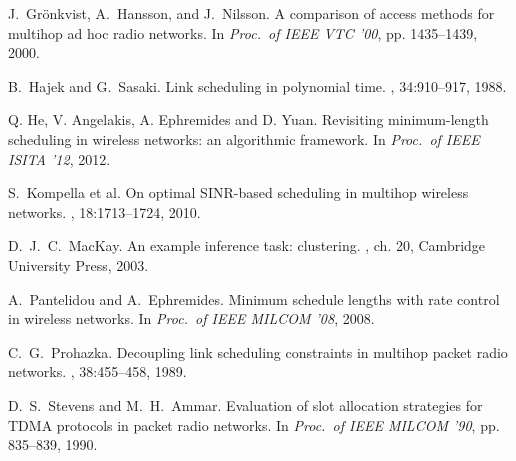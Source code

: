 \documentclass[10pt,onecolumn,journal,draftcls,oneside]{IEEEtran}
\newcounter{exam}
\begin{document}
\begin{thebibliography}{1}
J.~Gr{\"o}nkvist, A.~Hansson, and J.~Nilsson.
\newblock A comparison of access methods for multihop ad hoc radio networks.
\newblock In {\em Proc.\ of IEEE VTC '00}, pp. 1435--1439, 2000.

B.~Hajek and G.~Sasaki.
\newblock Link scheduling in polynomial time.
, 34:910--917, 1988.

Q. He, V. Angelakis, A. Ephremides and D. Yuan.
\newblock Revisiting minimum-length scheduling in wireless networks: an algorithmic framework.
\newblock In {\em Proc.\ of IEEE ISITA '12}, 2012.

S.~Kompella et al.
\newblock On optimal SINR-based scheduling in multihop wireless networks.
, 18:1713--1724, 2010.

D.~J.~C.~MacKay.
\newblock An example inference task: clustering.
, ch. 20, Cambridge University Press, 2003.

A.~Pantelidou and A.~Ephremides.
\newblock Minimum schedule lengths with rate control in wireless networks.
\newblock In {\em Proc.\ of IEEE MILCOM '08}, 2008.

C.~G.~Prohazka.
\newblock Decoupling link scheduling constraints in multihop packet radio
networks.
, 38:455--458, 1989.

D.~S.~Stevens and M.~H.~Ammar.
\newblock Evaluation of slot allocation strategies for TDMA protocols
in packet radio networks.
\newblock In {\em Proc.\ of IEEE MILCOM '90}, pp. 835--839, 1990.





















\end{thebibliography}

\appendices
\end{document}
